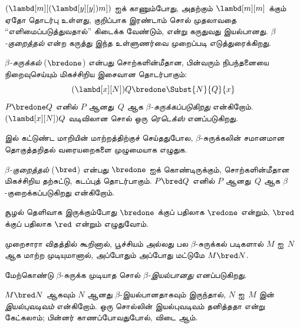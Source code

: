 \documentclass[../../../include/open-logic-section]{subfiles}
\begin{document}

$(\lambd[m][(\lambd[y][y]) m])$ ஐக் காணும்போது, அதற்கும்
$\lambd[m][m]$ க்கும் ஏதோ தொடர்பு உள்ளது, குறிப்பாக இரண்டாம் சொல் முதலாவதை
“எளிமைப்படுத்துவதால்” கிடைக்க வேண்டும், என்று கருதுவது இயல்பானது.
\emph{$\beta$-குறைத்தல்} என்ற கருத்து இந்த உள்ளுணர்வை முறைப்படி எடுத்துரைக்கிறது.

\begin{defn} 
  \emph{$\beta$-சுருக்கல்} ($\bredone$) என்பது சொற்களின்மீதான, பின்வரும்
  நிபந்தனையை நிறைவுசெய்யும் மிகச்சிறிய இசைவான தொடர்பாகும்:
  \[
    (\lambd[x][N])Q \bredone \Subst{N}{Q}{x}
  \]
  $P \bredone Q$ எனில் $P$ ஆனது~$Q$ ஆக \emph{$\beta$-சுருக்கப்படுகிறது}
  என்கிறோம். $(\lambd[x][N])Q$ வடிவிலான சொல் ஒரு \emph{ரெடெக்ஸ்}
  எனப்படுகிறது.
\end{defn}

\begin{prob} 
   இல் கட்டுண்ட மாறியின் மாற்றத்திற்குச்
  செய்ததுபோல, $\beta$-சுருக்கலின் சமானமான தொகுத்தறிதல் வரையறைகளை முழுமையாக
  எழுதுக.
\end{prob}

\begin{defn} 
  \emph{$\beta$-குறைத்தல்} ($\bred$) என்பது $\bredone$ ஐக் கொண்டிருக்கும்,
  சொற்களின்மீதான மிகச்சிறிய தற்சுட்டு, கடப்புத் தொடர்பாகும். $P \bred Q$
  எனில் $P$ ஆனது~$Q$ ஆக $\beta$-குறைக்கப்படுகிறது என்கிறோம்.
\end{defn}

சூழல் தெளிவாக இருக்கும்போது $\bredone$ க்குப் பதிலாக $\redone$ என்றும்,
$\bred$ க்குப் பதிலாக $\red$ என்றும் எழுதுவோம்.

முறைசாரா விதத்தில் கூறினால், பூச்சியம் அல்லது பல $\beta$-சுருக்கல் படிகளால்
$M$ ஐ~$N$ ஆக மாற்ற முடியுமானால், அப்போதும் அப்போது மட்டுமே $M \bred N$.

\begin{defn}
மேற்கொண்டு $\beta$-சுருக்க முடியாத சொல் \emph{$\beta$-இயல்பானது}
எனப்படுகிறது.
\end{defn}

$M \bred N$ ஆகவும் $N$ ஆனது $\beta$-இயல்பானதாகவும் இருந்தால், $N$ ஐ~$M$ இன்
\emph{இயல்புவடிவம்} என்கிறோம். ஒரு சொல்லின் இயல்புவடிவம் தனித்ததா என்று
கேட்கலாம்; பின்னர் காணப்போவதுபோல், விடை ஆம்.
\end{document}
